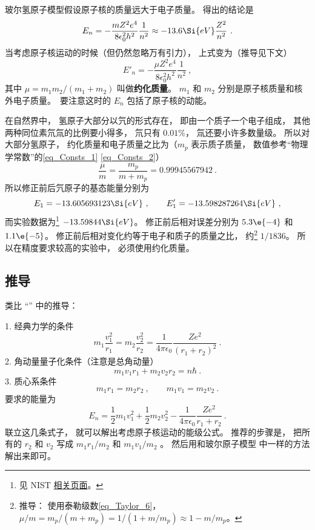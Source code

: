 
玻尔氢原子模型假设原子核的质量远大于电子质量。 得出的结论是
\begin{equation}
E_n = -\frac{mZ^2 e^4}{8\epsilon_0^2 h^2}\frac{1}{n^2} \approx  - 13.6\Si{eV} \frac{Z^2}{n^2}~.
\end{equation}
当考虑原子核运动的时候（但仍然忽略万有引力）， 上式变为（推导见下文）
\begin{equation}\label{eq_HRMass_1}
E'_n = -\frac{\mu Z^2 e^4}{8\epsilon_0^2 h^2} \frac{1}{n^2}~,
\end{equation}
其中 $\mu  = m_1 m_2/(m_1 + m_2)$ 叫做\textbf{约化质量}。 $m_1$ 和 $m_2$ 分别是原子核质量和核外电子质量。　要注意这时的 $E_n$ 包括了原子核的动能。

在自然界中， 氢原子大部分以氕的形式存在， 即由一个质子一个电子组成， 其他两种同位素氘氚的比例要小得多， 氘只有 $0.01\%$， 氚还要小许多数量级。 所以对大部分氢原子， 约化质量和电子质量之比为（$m_p$ 表示质子质量， 数值参考“物理学常数”的\autoref{eq_Consts_1} \autoref{eq_Consts_2}）
\begin{equation}
\frac{\mu}{m} = \frac{m_p}{m + m_p} = 0.99945567942~.
\end{equation}
所以修正前后氕原子的基态能量分别为
\begin{equation}
E_1 = -13.605693123\Si{eV} ~,\qquad 
E'_1 = -13.598287264\Si{eV}~,
\end{equation}
而实验数据为\footnote{见 NIST \href{https://webbook.nist.gov/cgi/cbook.cgi?ID=C12385136&Mask=20}{相关页面}。} $-13.59844\Si{eV}$。 修正前后相对误差分别为 $5.3\e{-4}$ 和 $1.1\e{-5}$。 修正前后相对变化约等于电子和质子的质量之比， 约\footnote{推导： 使用泰勒级数\autoref{eq_Taylor_6}， $\mu/m = m_p/(m + m_p) = 1/(1 + m/m_p) \approx 1 - m/m_p$。} $1/1836$。 所以在精度要求较高的实验中， 必须使用约化质量。

\subsection{推导}
类比 “” 中的推导：

1. 经典力学的条件
\begin{equation}
m_1 \frac{v_1^2}{r_1} = m_2 \frac{v_2^2}{r_2} = \frac{1}{4\pi\epsilon_0} \frac{Z e^2}{(r_1 + r_2)^2}~.
\end{equation}
2. 角动量量子化条件（注意是总角动量）
\begin{equation}
m_1 v_1 r_1 + m_2 v_2 r_2 = n\hbar ~.
\end{equation}
3. 质心系条件
\begin{equation}
m_1 r_1 = m_2 r_2 ~,\qquad m_1 v_1 = m_2 v_2~.
\end{equation}
要求的能量为
\begin{equation}
E_n = \frac12 m_1 v_1^2 + \frac12 m_2 v_2^2 - \frac{1}{4\pi\epsilon_0} \frac{Z e^2}{r_1 + r_2}~.
\end{equation}
联立这几条式子， 就可以解出考虑原子核运动的能级公式。 推荐的步骤是， 把所有的 $r_2$ 和 $v_2$ 写成 $m_1 r_1/m_2$ 和 $m_1 v_1/m_2$ 。 然后用和玻尔原子模型%
中一样的方法解出来即可。
